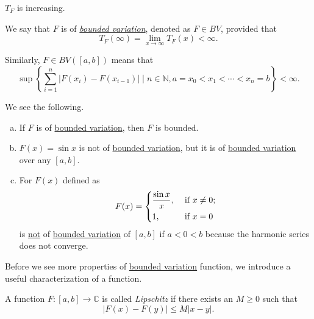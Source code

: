 \begin{remark}
	\(T_F\) is increasing.
\end{remark}

\begin{definition}\label{def:bounded-variation}
	We say that \(F\) is of \emph{\hyperref[def:bounded-variation]{bounded variation}}, denoted as \(F \in BV\), provided that
	\[
		T_F(\infty) = \lim_{x \to \infty} T_F(x) < \infty.
	\]

	Similarly, \(F \in BV([a,b])\) means that
	\[
		\sup \left\{\sum_{i=1}^n \left\vert F(x_i) - F(x_{i-1}) \right\vert \mid n \in \mathbb{N} , a = x_0 < x_1 < \cdots < x_n = b\right\} < \infty.
	\]
\end{definition}

\begin{remark}
	We see the following.
	\begin{enumerate}[(a)]
		\item If \(F\) is of \hyperref[def:bounded-variation]{bounded variation}, then \(F\) is bounded.
		\item \(F(x) = \sin x\) is not of \hyperref[def:bounded-variation]{bounded variation}, but it is of \hyperref[def:bounded-variation]{bounded variation}
		      over any \([a,b]\).
		\item For \(F(x)\) defined as
		      \[
			      F(x) = \begin{dcases}
				      \frac{\sin x}{x}, & \text{ if } x\neq 0 ; \\
				      1,                & \text{ if } x = 0
			      \end{dcases}
		      \]
		      is \underline{not} of \hyperref[def:bounded-variation]{bounded variation} of \([a,b]\) if \(a < 0 < b\) because the harmonic series does not converge.
	\end{enumerate}
\end{remark}

Before we see more properties of \hyperref[def:bounded-variation]{bounded variation} function, we introduce a useful characterization of a function.
\begin{definition}[Lipschitz]\label{def:Lipschitz}
	A function \(F \colon [a,b] \to \mathbb{C} \) is called \emph{Lipschitz} if there exists an
	\(M \geq 0\) such that
	\[
		\left\vert F(x) - F(y) \right\vert \leq M \left\vert x - y \right\vert.
	\]
\end{definition}

